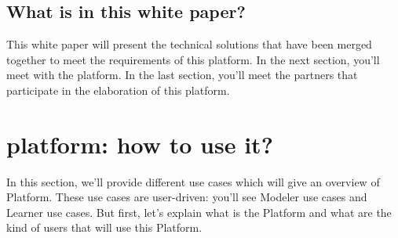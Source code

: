 \documentclass{learnpad}
\begin{document}
\section{What is in this white paper?}
This white paper will present the technical solutions that have been merged
together to meet the requirements of this \learnpad platform.  In the next
section, you'll meet with the \learnpad platform.  In the last section, you'll
meet the partners that participate in the elaboration of this \learnpad
platform.

\chapter{\learnpad platform: how to use it?}
In this section, we'll provide different use cases which will give an overview
of \learnpad Platform.  These use cases are user-driven: you'll see Modeler use
cases and Learner use cases.  But first, let's explain what is the \learnpad
Platform and what are the kind of users that will use this \learnpad Platform.
\end{document}
